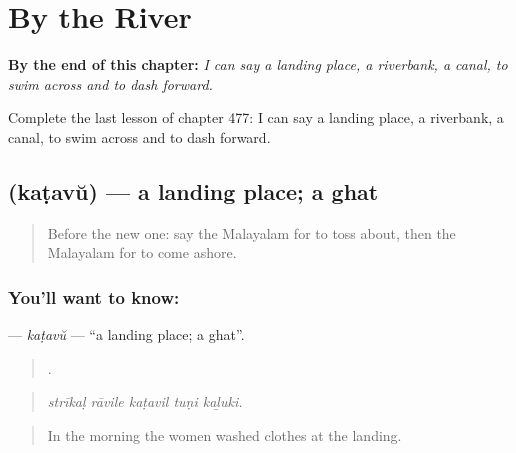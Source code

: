 
\chapter{By the River}
\label{ch:ml-by-the-river}

\begin{chapteropening}
\textbf{By the end of this chapter:} \emph{I can say a landing place, a riverbank, a canal, to swim across and to dash forward.}

Complete the last lesson of chapter 477: I can say a landing place, a riverbank, a canal, to swim across and to dash forward.
\end{chapteropening}

\section[\texorpdfstring{\ml{കടവ്} (kaṭavŭ)}{കടവ് (kaṭavŭ)}]{ (kaṭavŭ) — a landing place; a ghat}

\label{lesson:ML-C477-katavu}



\begin{quote}
Before the new one: say the Malayalam for to toss about, then the Malayalam for to come ashore.
\end{quote}

\subsection*{You'll want to know: }
\textbf{} — \emph{kaṭavŭ} — \textquotedblleft{}a landing place; a ghat\textquotedblright{}.

\begin{quote}
    .
\end{quote}

\begin{quote}
\emph{strīkaḷ rāvile kaṭavil tuṇi kaḻuki.}
\end{quote}

\begin{quote}
In the morning the women washed clothes at the landing.
\end{quote}

